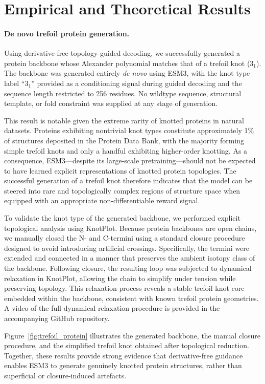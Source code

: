 \documentclass{article}
\begin{document}
\section{Empirical and Theoretical Results}

\paragraph{De novo trefoil protein generation.}
Using derivative-free topology-guided decoding, we successfully generated a protein backbone whose Alexander polynomial matches that of a trefoil knot ($3_1$).
The backbone was generated entirely \emph{de novo} using ESM3, with the knot type label ``$3_1$'' provided as a conditioning signal during guided decoding and the sequence length restricted to 256 residues.
No wildtype sequence, structural template, or fold constraint was supplied at any stage of generation.

This result is notable given the extreme rarity of knotted proteins in natural datasets.
Proteins exhibiting nontrivial knot types constitute approximately 1\% of structures deposited in the Protein Data Bank, with the majority forming simple trefoil knots and only a handful exhibiting higher-order knotting.
As a consequence, ESM3—despite its large-scale pretraining—should not be expected to have learned explicit representations of knotted protein topologies.
The successful generation of a trefoil knot therefore indicates that the model can be steered into rare and topologically complex regions of structure space when equipped with an appropriate non-differentiable reward signal.

To validate the knot type of the generated backbone, we performed explicit topological analysis using KnotPlot.
Because protein backbones are open chains, we manually closed the N- and C-termini using a standard closure procedure designed to avoid introducing artificial crossings.
Specifically, the termini were extended and connected in a manner that preserves the ambient isotopy class of the backbone.
Following closure, the resulting loop was subjected to dynamical relaxation in KnotPlot, allowing the chain to simplify under tension while preserving topology.
This relaxation process reveals a stable trefoil knot core embedded within the backbone, consistent with known trefoil protein geometries.
A video of the full dynamical relaxation procedure is provided in the accompanying GitHub repository.

Figure~\ref{fig:trefoil_protein} illustrates the generated backbone, the manual closure procedure, and the simplified trefoil knot obtained after topological reduction.
Together, these results provide strong evidence that derivative-free guidance enables ESM3 to generate genuinely knotted protein structures, rather than superficial or closure-induced artefacts.
\end{document}
